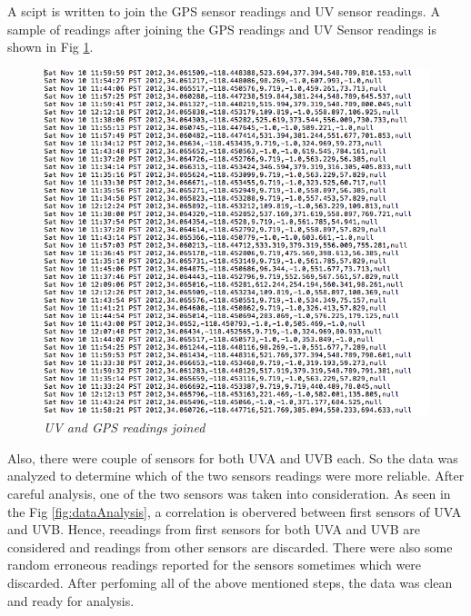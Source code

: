 \documentclass[12pt,fullpage,doublespace]{article}
\begin{document}
A scipt is written to join the GPS sensor readings and UV sensor readings. A sample of readings after joining the GPS readings and UV Sensor readings is shown in Fig \ref{fig:joinedReadings}.\begin{figure}
\begin{center}
\includegraphics[scale=0.45]{joinedReadings.png}
\caption{\small \sl UV and GPS readings joined\label{fig:joinedReadings}}
\end{center}
\end{figure} Also, there were couple of sensors for both UVA and UVB each. So the data was analyzed to determine which of the two sensors readings were more reliable. After careful analysis, one of the two sensors was taken into consideration. As seen in the Fig \ref{fig:dataAnalysis}, a correlation is obervered between first sensors of UVA and UVB. Hence, reeadings from first sensors for both UVA and UVB are considered and readings from other sensors are discarded. There were also some random erroneous readings reported for the sensors sometimes which were discarded. After perfoming all of the above mentioned steps, the data was clean and ready for analysis.
\end{document}

